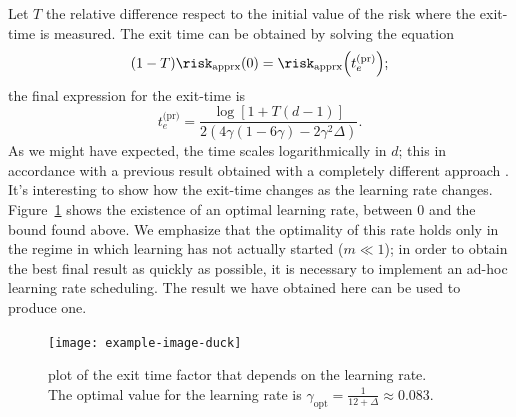 Let \(T\) the relative difference respect to the initial value of the risk where the exit-time is measured.
The exit time can be obtained by solving the equation
\[
  (1-T)\risk_\text{apprx}{(0)} = \risk_\text{apprx}{\left(t^\text{(pr)}_e\right)};
\]
the final expression for the exit-time is
\[
  t^\text{(pr)}_e = \frac{\log\left[1+T(d-1)\right]}{2\left(4\gamma(1-6\gamma)-2\gamma^2\Delta\right)}.
\]
As we might have expected, the time scales logarithmically in \(d\); this in accordance with a previous result obtained 
with a completely different approach \cite{arous2021online}.
It's interesting to show how the exit-time changes as the learning rate changes.
Figure~\ref{fig:time_learnignrate_plot} shows the existence of an optimal learning rate, between 0 and the bound found above.
We emphasize that the optimality of this rate holds only in the regime in which learning has not actually started (\(m\ll1\));
in order to obtain the best final result as quickly as possible, it is necessary to implement an ad-hoc learning rate scheduling.
The result we have obtained here can be used to produce one.
\begin{figure}
  \centering
  \texttt{[image: example-image-duck]}
  \caption{
    plot of the exit time factor that depends on the learning rate.\\
    The optimal value for the learning rate is \(\gamma_\text{opt} = \frac{1}{12+\Delta} \approx \num{0.083}.\)
  }
  \label{fig:time_learnignrate_plot}
\end{figure}

